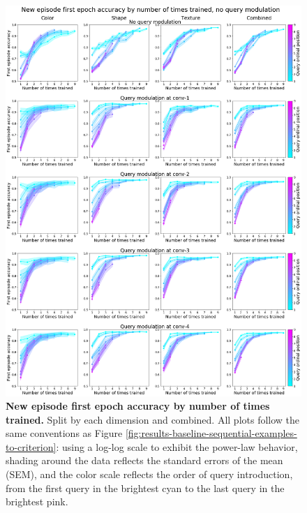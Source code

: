 \begin{figure}[!htb]
\centering
\includegraphics[width=\linewidth]{ch-results/figures/query_mod_benchmark/first_episode_accuracy_per_modualtion_level_times_trained.png}
\caption[New episode first epoch accuracy by number of times trained.]{ {\bf New episode first epoch accuracy by number of times trained.} Split by each dimension and combined. All plots follow the same conventions as Figure \ref{fig:results-baseline-sequential-examples-to-criterion}: using a log-log scale to exhibit the power-law behavior, shading around the data reflects the standard errors of the mean (SEM), and the color scale reflects the order of query introduction, from the first query in the brightest cyan to the last query in the brightest pink.}
\label{fig:results-query-mod-benchmark-first-episode-accuracy-per-modualtion-level-times-trained}
\end{figure}

